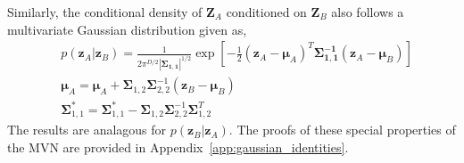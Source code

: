 Similarly, the conditional density of $\mathbf{Z}_A$ conditioned on $\mathbf{Z}_B$ also follows a multivariate Gaussian distribution given as,
\begin{equation}
	\begin{split}
		& p(\mathbf{z}_A|\mathbf{z}_B) = \frac{1}{2\pi^{D/2}|\boldsymbol{\Sigma_{1,1}}|^{1/2}} \exp{\left[-\frac{1}{2}(\mathbf{z}_A-\boldsymbol{\mu}_A)^T\boldsymbol{\Sigma^{-1}_{1,1}}(\mathbf{z}_A-\boldsymbol{\mu}_B)\right]} \\
		& \boldsymbol{\mu}_A = \boldsymbol{\mu}_A + \boldsymbol{\Sigma}_{1,2} \boldsymbol{\Sigma}^{-1}_{2,2} \left(\mathbf{z}_B - \boldsymbol{\mu}_B \right) \\
		& \boldsymbol{\Sigma}^*_{1,1} = \boldsymbol{\Sigma}^*_{1,1} - \boldsymbol{\Sigma}_{1,2} \boldsymbol{\Sigma}^{-1}_{2,2} \boldsymbol{\Sigma}^T_{1,2} 
	\end{split}
\label{eq:gaussian_conditional}
\end{equation}
The results are analagous for $p(\mathbf{z}_B|\mathbf{z}_A)$. 
The proofs of these special properties of the MVN are provided in Appendix~\ref{app:gaussian_identities}.

